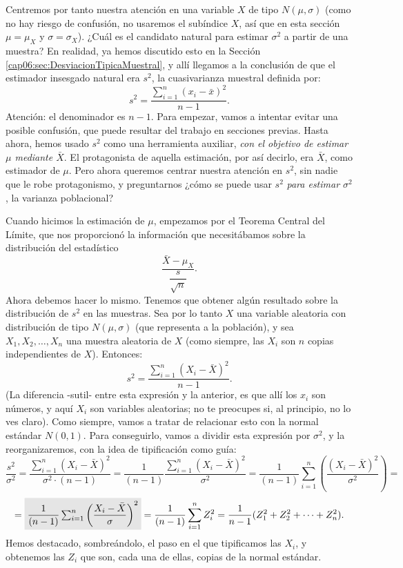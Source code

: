 Centremos por tanto nuestra atención en una variable $X$ de tipo
$N(\mu,\sigma)$ (como no hay riesgo de confusión, no usaremos el subíndice $X$,
así que en esta sección $\mu=\mu_X$ y $\sigma=\sigma_X$).  ¿Cuál es el
candidato natural para estimar $\sigma^2$ a partir de una muestra? En realidad,
ya hemos discutido esto en la Sección \ref{cap06:sec:DesviacionTipicaMuestral},
y allí llegamos a la conclusión de que el estimador insesgado natural era
$s^2$, la cuasivarianza muestral definida por:
       \[s^2=\dfrac{\displaystyle\sum_{i=1}^n(x_i-\bar x)^2}{n-1}.\]
Atención: el denominador es $n-1$. Para empezar, vamos a intentar evitar una
posible confusión, que puede resultar del trabajo en secciones previas. Hasta
ahora, hemos usado $s^2$ como una herramienta auxiliar, {\em con el objetivo de
estimar $\mu$ mediante $\bar X$}. El protagonista de aquella estimación, por
así decirlo, era $\bar X$, como estimador de $\mu$. Pero ahora queremos centrar
nuestra atención en $s^2$, sin nadie que le robe protagonismo, y preguntarnos
¿cómo se puede usar $s^2$ {\em para estimar $\sigma^2$}, la varianza
poblacional?

Cuando hicimos la estimación de $\mu$, empezamos por el Teorema Central del
Límite, que nos proporcionó la información que necesitábamos sobre la
distribución del estadístico
\[\dfrac{\bar X-\mu_X}{\dfrac{s}{\sqrt{n}}}.\]
Ahora debemos hacer lo mismo. Tenemos que obtener algún resultado sobre la
distribución de $s^2$ en las muestras. Sea por lo tanto $X$ una variable
aleatoria con distribución de tipo $N(\mu,\sigma)$ (que representa a la
población), y sea $X_1,X_2,\ldots,X_n$ una muestra aleatoria de $X$ (como
siempre, las $X_i$ son $n$ copias independientes de $X$).  Entonces:
    \[s^2=\dfrac{\displaystyle\sum_{i=1}^n(X_i-\bar X)^2}{{n-1}}.\]
(La diferencia -sutil- entre esta expresión y la anterior, es que allí los
$x_i$ son números, y aquí $X_i$ son variables aleatorias; no te preocupes si,
al principio, no lo ves claro). Como siempre, vamos a tratar de relacionar esto
con la normal estándar $N(0,1)$. Para conseguirlo, vamos a dividir esta
expresión por $\sigma^2$, y la reorganizaremos, con la idea de tipificación
como guía:
    \begin{equation}\label{cap06:ecu:ObtenerDistribucionCuasivarianzaMuestral}
        \dfrac{s^2}{\sigma^2}=\dfrac{\displaystyle\sum_{i=1}^n(X_i-\bar X)^2}{\sigma^2\cdot(n-1)}=
        \dfrac{1}{(n-1)}\dfrac{\displaystyle\sum_{i=1}^n(X_i-\bar X)^2}{\sigma^2}=\dfrac{1}{(n-1)}\sum_{i=1}^n\left(\dfrac{(X_i-\bar X)^2}{\sigma^2}\right)=
    \end{equation}
    \[
        =\colorbox{lightgrey}{$\dfrac{1}{(n-1)}\sum_{i=1}^n\left(\dfrac{X_i-\bar X}{\sigma}\right)^2$}=\dfrac{1}{(n-1)}\sum_{i=1}^n Z_i^2=\dfrac{1}{n-1}(Z_1^2+Z_2^2+\cdots+Z_n^2).\]
Hemos destacado, sombreándolo, el paso en el que tipificamos las $X_i$, y
obtenemos las $Z_i$ que son, cada una de ellas, copias de la normal estándar.

